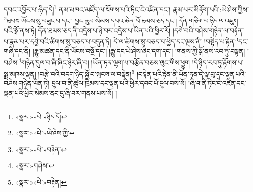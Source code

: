 དབང་འབྱོར་པ་:ཉིད་དེ།\footnote{«སྣར་»«པེ་»ཉིད་དོ།} ནམ་མཁའ་མཛོད་ལ་སོགས་པའི་ཏིང་ངེ་འཛིན་དང་། རྣམ་པར་མི་རྟོག་པའི་:ཡེ་ཤེས་ཀྱིས་\footnote{«སྣར་»«པེ་»ཡེ་ཤེས་ཀྱི་}ཐབས་ཡོངས་སུ་བཟུང་བ་དང་། བྱང་ཆུབ་སེམས་དཔའ་ཆེན་པོ་ཐམས་ཅད་དང་། དོན་གཅིག་པ་ཉིད་ལ་འཇུག་པའི་སྒོ་ནས་ཏེ། དོན་ཐམས་ཅད་ནི་འདྲེས་པ་ཉེ་བར་འདྲེས་པ་ཡིན་པའི་ཕྱིར་རོ། །དགེ་བའི་བཤེས་གཉེན་ལ་བརྟེན་པ་རྣམ་པར་དབྱེ་བའི་ཚིགས་སུ་བཅད་པ་བདུན་ཏེ། དེ་ལ་ཚིགས་སུ་བཅད་པ་ཕྱེད་དང་ལྔས་ནི། །བསྟེན་པ་རྟེན་\footnote{«སྣར་»«པེ་»བརྟེན་}དང་གཞི་དང་ནི། །རྒྱུ་མཚན་དང་ནི་ཡོངས་བསྔོ་དང་། །རྒྱུ་དང་ཡེ་ཤེས་ཞིང་དག་དང་། །གནས་ཀྱི་སྒོ་ནས་རབ་ཏུ་བསྟན། །བཤེས་\footnote{«སྣར་»གཤེས་}གཉེན་དུལ་བ་ཞི་ཞིང་ཉེར་ཞི་བ། །ཡོན་ཏན་ལྷག་པ་བརྩོན་བཅས་ལུང་གིས་ཕྱུག །དེ་ཉིད་རབ་ཏུ་རྟོགས་པ་སྨྲ་མཁས་ལྡན། །བརྩེ་བའི་བདག་ཉིད་སྐྱོ་བ་སྤངས་ལ་བསྟེན།\footnote{«སྣར་»«པེ་»བརྟེན།} །བསྟེན་པའི་རྟེན་ནི་ཡོན་ཏན་དེ་ལྟ་བུ་དང་ལྡན་པའི་བཤེས་གཉེན་ཡིན་ཏེ། དུལ་བ་ནི་ཚུལ་ཁྲིམས་དང་ལྡན་པའི་ཕྱིར་དབང་པོ་དུལ་བས་སོ། །ཞི་བ་ནི་ཏིང་ངེ་འཛིན་དང་ལྡན་པའི་ཕྱིར་སེམས་ནང་དུ་ཞི་བར་གནས་པས་སོ། །
